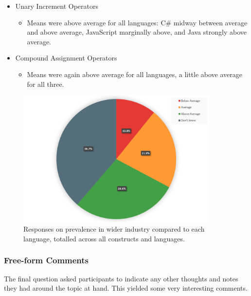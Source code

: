 \documentclass{article}
\begin{document}
\begin{itemize}
                \item Unary Increment Operators
                \begin{itemize}
                    \item Means were above average for all languages: C\# midway between average and above average, JavaScript marginally above, and Java strongly above average.                
                \end{itemize}
                \item Compound Assignment Operators
                \begin{itemize}
                    \item Means were again above average for all languages, a little above average for all three.  
                \end{itemize}
            \end{itemize}

            \begin{figure}[htbp]
                \centering
                \includegraphics[width=0.9\textwidth]{industryPie}
                \caption{Responses on prevalence in wider industry compared to each language, totalled across all constructs and languages.}
                \label{fig:industryPie}
            \end{figure}            

        \subsubsection{Free-form Comments}
        \label{subsubsec:freeFormComments}
            The final question asked participants to indicate any other thoughts and notes they had around the topic at hand. This yielded some very interesting comments.
\end{document}
